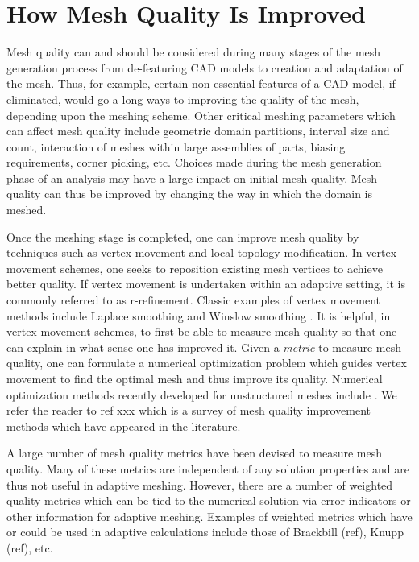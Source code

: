 \documentclass[letter]{report}
\begin{document}
\section{How Mesh Quality Is Improved}
Mesh quality can and should be considered during many stages of 
the mesh generation process from de-featuring CAD models to  
creation and adaptation of the mesh. Thus, for example, certain
non-essential features of a CAD model, if eliminated, would go a 
long ways to improving the quality of the mesh, depending upon
the meshing scheme. Other critical meshing parameters which can 
affect mesh quality include geometric domain partitions, interval size
and count, interaction of meshes within large assemblies of parts, 
biasing requirements, corner picking, etc. Choices made during the 
mesh generation phase of an analysis may have a large impact on 
initial mesh quality.  Mesh quality can thus be improved by changing the 
way in which the domain is meshed. \newline

Once the meshing stage is completed, one can improve mesh quality
by techniques such as vertex movement and local topology modification.
In vertex movement schemes, one seeks to reposition existing mesh vertices to 
achieve better quality. If vertex movement is undertaken within an adaptive 
setting, it is commonly referred to as r-refinement. 
Classic examples of vertex movement methods 
include Laplace smoothing \cite{F88} and Winslow smoothing \cite{Winslow}. 
It is helpful, in vertex movement schemes, to first be 
able to measure mesh quality so that one can explain in what sense one 
has improved it. Given a {\it metric} to measure mesh quality, 
one can formulate a numerical 
optimization problem which guides vertex movement to find the optimal 
mesh and thus improve its quality.  Numerical 
optimization methods recently
developed for unstructured meshes include \cite{Opt-MS,Kn00,FrKn01,
FeasNewt,bjoe:swap,bjoe:chain-swap,es92}. We refer the reader to ref xxx
which is a survey of mesh quality improvement methods which have appeared 
in the literature. \newline

A large number of mesh quality metrics have been devised to measure 
mesh quality. Many of these metrics are independent of any solution 
properties and are thus not useful in adaptive meshing. However, there
are a number of weighted quality metrics which can be tied to the 
numerical solution via error indicators or other information for adaptive 
meshing. Examples of weighted metrics which have or could be used in 
adaptive calculations include those of Brackbill (ref), Knupp (ref), etc. \newline
\end{document}
